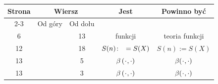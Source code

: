 \documentclass[a4paper,11pt]{article}
\numberwithin{equation}{section}
\begin{document}



\newpage



\begin{center}

  \begin{tabular}{|c|c|c|c|c|}
    \hline
    Strona & \multicolumn{2}{c|}{Wiersz} & Jest
    & Powinno być \\ \cline{2-3}
    & Od góry & Od dołu & & \\
    \hline
    \hphantom{0}6 & & 13 & funkcji & teoria funkcji \\
    12 & & 18 & $S( n )\! : \hphantom{0} = S( X )$ & $S( n ) := S( X )$ \\
    13 & & \hphantom{0}5 & $\beta \, ( \hspace{0.05em} \cdot \hspace{0.05em} , \cdot )$
    & $\beta ( \hspace{0.05em} \cdot \hspace{0.05em} , \cdot )$ \\
    13 & & \hphantom{0}3 & $\beta \, ( \hspace{0.05em} \cdot \hspace{0.05em} , \cdot )$
    & $\beta ( \hspace{0.05em} \cdot \hspace{0.05em} , \cdot )$ \\
    \hline
  \end{tabular}

\end{center}

\VerSpaceTwo


\noindent













\printbibliography





\end{document}
